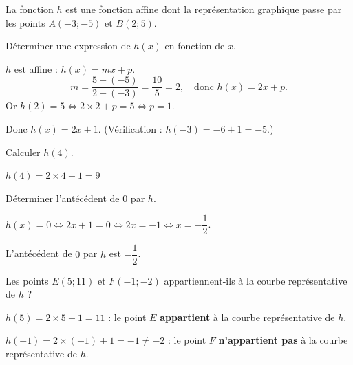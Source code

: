 \documentclass[12pt,a4paper]{book}
\begin{document}
La fonction $h$ est une fonction affine dont la représentation graphique passe par les points $A(-3 ; -5)$ et $B(2 ; 5)$.
\begin{enumMet}
	\item Déterminer une expression de $h(x)$ en fonction de $x$.

	\begin{corrBox}
		$h$ est affine : $h(x)=mx+p$.
		\[m=\frac{5-(-5)}{2-(-3)}=\frac{10}{5}=2, \quad\text{donc } h(x)=2x+p.\]
		Or $h(2)=5 \iff 2\times 2+p=5 \iff p=1$.

		Donc $h(x)=2x+1$. \quad (Vérification : $h(-3)=-6+1=-5$.)
	\end{corrBox}
	\item Calculer $h(4)$.

	\begin{corrBox}
		$h(4)=2\times 4+1=9$
	\end{corrBox}
	\item Déterminer l'antécédent de $0$ par $h$.

	\begin{corrBox}
		$h(x)=0 \iff 2x+1=0 \iff 2x=-1 \iff x=-\dfrac{1}{2}$.

		L'antécédent de $0$ par $h$ est $-\dfrac{1}{2}$.
	\end{corrBox}
	\item Les points $E(5 ; 11)$ et $F(-1 ; -2)$ appartiennent-ils à la courbe représentative de $h$ ?

	\begin{corrBox}
		$h(5)=2\times 5+1=11$ : le point $E$ \textbf{appartient} à la courbe représentative de $h$.

		$h(-1)=2\times(-1)+1=-1\neq -2$ : le point $F$ \textbf{n'appartient pas} à la courbe représentative de $h$.
	\end{corrBox}
\end{enumMet}
\end{document}
